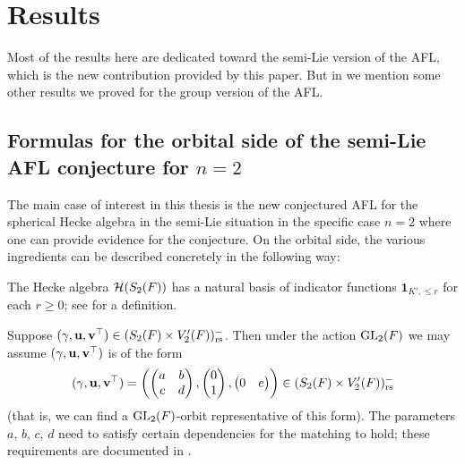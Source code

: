 \section{Results}
Most of the results here are dedicated toward the semi-Lie version of the AFL,
which is the new contribution provided by this paper.
But in  we mention some other results
we proved for the group version of the AFL.

\subsection{Formulas for the orbital side of the semi-Lie AFL conjecture for $n=2$}
\label{sec:semi_lie_intro_formulas}
The main case of interest in this thesis is the new conjectured AFL
for the spherical Hecke algebra in the semi-Lie situation in the
specific case $n = 2$ where one can provide evidence for the conjecture.
On the orbital side, the various ingredients can be described concretely
in the following way:
\begin{itemize}
  \ii The Hecke algebra $\mathcal H(S_2(F))$ has a natural basis of
  indicator functions $\mathbf{1}_{K', \le r}$ for each $r \ge 0$;
  see  for a definition.

  \ii Suppose ${(\gamma, \mathbf u, \mathbf v^\top)} \in (S_2(F) \times V'_2(F))_{\mathrm{rs}}^-$.
  Then under the action $\operatorname{GL}_2(F)$ we may assume ${(\gamma, \mathbf u, \mathbf v^\top)}$ is of the form
  \[
    {(\gamma, \mathbf u, \mathbf v^\top)} = \left( \begin{pmatrix} a & b \\ c & d \end{pmatrix},
      \begin{pmatrix} 0 \\ 1 \end{pmatrix},
      \begin{pmatrix} 0 & e \end{pmatrix} \right)
    \in (S_2(F) \times V_2'(F))_{\mathrm{rs}}^-
  \]
  (that is, we can find a $\operatorname{GL}_2(F)$-orbit representative of this form).
  The parameters $a$, $b$, $c$, $d$ need to satisfy certain dependencies
  for the matching to hold;
  these requirements are documented in .
\end{itemize}

